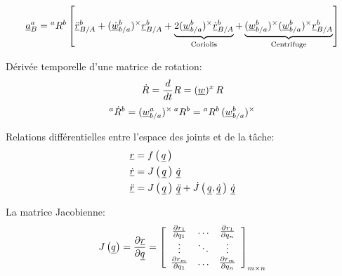 \begin{align}
\underline{a}_{B}^{a} 
= 
{}^{a}R^b \left[ 
\underline{\ddot{r}}^b_{B/A}
+ 
(\underline{\dot{w}}_{b/a}^b)^{\times} \underline{r}^b_{B/A}  
+
\underbrace{
2 (\underline{w}_{b/a}^b)^{\times} \underline{\dot{r}}^b_{B/A}  
}_{\text{Coriolis}}
+
\underbrace{
(\underline{w}_{b/a}^b)^{\times} (\underline{w}_{b/a}^b)^{\times} \underline{r}^b_{B/A}  
}_{\text{Centrifuge}}
\right] 
\end{align}

Dérivée temporelle d'une matrice de rotation:
\begin{equation}
\dot{R} = \frac{d}{dt} R = (\underline{w})^x \, R
\end{equation}
\begin{equation}
{}^{a}\dot{R}^b =  (\underline{w}_{b/a}^a)^{\times} \, {}^{a}R^b =   {}^{a}R^b \, (\underline{w}_{b/a}^b)^{\times}
\end{equation}

Relations différentielles entre l'espace des joints et de la tâche:
\begin{align}
\underline{r} &= f\left( \, \underline{q} \, \right) \\
\underline{\dot{r}} &= J\left( \, \underline{q} \, \right) \, \underline{\dot{q}} \\
\underline{\ddot{r}} &= J\left( \, \underline{q} \, \right) \, \underline{\ddot{q}}  + \dot{J} \left( \, \underline{q}  , \underline{\dot{q}} \, \right) \, \underline{\dot{q}} 
\end{align}

La matrice Jacobienne:
\begin{equation}
J\left( \underline{q} \right) = \frac{\partial \underline{r}}{\partial \underline{q}} = 
\left[ \begin{array}{c c c} 
\frac{\partial r_1 }{\partial q_1}   &  \hdots & \frac{\partial r_1 }{\partial q_n} \\ 
\vdots                               &  \ddots & \vdots                             \\
\frac{\partial r_m }{\partial q_1}   &  \hdots & \frac{\partial r_m }{\partial q_n}
\end{array} \right]_{m \times n}
\end{equation}
